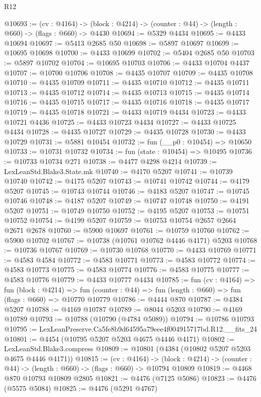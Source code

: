 \begin{lexlean}{R12}
\begin{coremodule}
@10693 := (cv : @4164) ->
  (block : @4214) -> (counter : @44) -> (length : @660) -> (flags : @660) -> @4430
@10694 := @5329 @4434
@10695 := @4433 @10694
@10697 := @5413 @2685 @50
@10698 := @5897 @10697
@10699 := @10695 @10698
@10700 := @4433 @10699
@10702 := @5404 @2685 @50
@10703 := @5897 @10702
@10704 := @10695 @10703
@10706 := @4433 @10704 @4437
@10707 := @10700 @10706
@10708 := @4435 @10707
@10709 := @4435 @10708
@10710 := @4435 @10709
@10711 := @4435 @10710
@10712 := @4435 @10711
@10713 := @4435 @10712
@10714 := @4435 @10713
@10715 := @4435 @10714
@10716 := @4435 @10715
@10717 := @4435 @10716
@10718 := @4435 @10717
@10719 := @4435 @10718
@10721 := @4433 @10719 @4434
@10723 := @4433 @10721 @4436
@10725 := @4433 @10723 @4434
@10727 := @4433 @10725 @4434
@10728 := @4435 @10727
@10729 := @4435 @10728
@10730 := @4433 @10729
@10731 := @5881 @10454
@10732 := fun (__p0 : @10454) => @10650
@10733 := @10731 @10732
@10734 := fun (state : @10454) => @10495
@10736 := @10733 @10734 @271
@10738 := @4477 @4298 @4214
@10739 := LexLeanStd.Blake3.State.mk
@10740 := @4170 @5207
@10741 := @10739 @10740
@10742 := @4175 @5207
@10743 := @10741 @10742
@10744 := @4179 @5207
@10745 := @10743 @10744
@10746 := @4183 @5207
@10747 := @10745 @10746
@10748 := @4187 @5207
@10749 := @10747 @10748
@10750 := @4191 @5207
@10751 := @10749 @10750
@10752 := @4195 @5207
@10753 := @10751 @10752
@10754 := @4199 @5207
@10759 := @10753 @10754 @2657 @2664 @2671 @2678
@10760 := @5900 @10697
@10761 := @10759 @10760
@10762 := @5900 @10702
@10767 := @10738 (@10761 @10762 @4446 @4171) @5203
@10768 := @10736 @10767
@10769 := @10730 @10768
@10770 := @4433 @10769
@10771 := @4583 @4584
@10772 := @4583 @10771
@10773 := @4583 @10772
@10774 := @4583 @10773
@10775 := @4583 @10774
@10776 := @4583 @10775
@10777 := @4583 @10776
@10779 := @4433 @10777 @4434
@10785 := fun (cv : @4164) =>
  fun (block : @4214) =>
  fun (counter : @44) => fun (length : @660) => fun (flags : @660) => @10770 @10779
@10786 := @4444 @870
@10787 := @4384 @5207
@10788 := @4169 @10787
@10789 := @8044 @5203
@10790 := @4169 @10789
@10793 := @10788 (@10790 (@4784 @5089))
@10794 := @10786 @10793
@10795 := LexLeanPreserve.Ca5fe8b9d64595a79eee4f004915717bd.R12.__fits_24
@10801 := @4454 (@10795 @5207 @5203 @4675 @4446 @4171)
@10802 := LexLeanStd.Blake3.compress
@10809 := @10801 (@4384 (@10802 @5207 @5203 @4675 @4446 @4171))
@10815 := (cv : @4164) ->
  (block : @4214) -> (counter : @44) -> (length : @660) -> (flags : @660) -> @10794 @10809
@10819 := @4468 @870 @10793 @10809 @2805
@10821 := @4476 (@7125 @5086)
@10823 := @4476 (@5575 @5084)
@10825 := @4476 (@5291 @4767)

\end{coremodule}
\end{lexlean}
